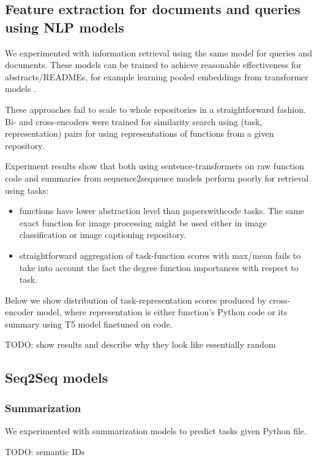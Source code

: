 \documentclass[11pt]{report}
\begin{document}
\subsection{Feature extraction for documents and queries using NLP models}

We experimented with information retrieval using the same model for queries and
documents. These models can be trained to achieve reasonable effectiveness
for abstracts/READMEs, for example learning pooled embeddings from transformer
models \cite{sentence_transformers}.

These approaches fail to scale to whole repositories in a straightforward
fashion. Bi- and cross-encoders were trained for similarity search using (task, representation) pairs for
using representations of functions from a given repository. 

Experiment results show
that both using sentence-transformers on raw function code and summaries from
sequence2sequence models perform
poorly for retrieval using tasks:

\begin{itemize}
\item functions have lower abstraction level than paperswithcode tasks. The same
  exact function for image processing might be used either in image
  classification or image captioning repository.
\item straightforward aggregation of task-function scores with max/mean fails to
  take into account the fact the degree function importances with respect to task. 
\end{itemize}

Below we show distribution of task-representation scores produced by
cross-encoder model, where representation is either function's Python code or
its summary using T5 model finetuned on code.

TODO: show results and describe why they look like essentially random

\subsection{Seq2Seq models}

\subsubsection{Summarization}

We experimented with summarization models to predict tasks given Python file.

TODO: semantic IDs
\end{document}
